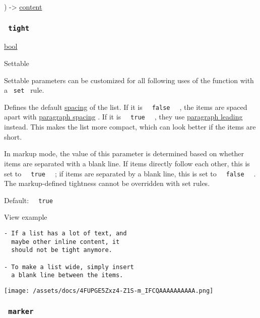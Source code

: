 ) -\textgreater{} \href{/docs/reference/foundations/content/}{content}

\subsubsection{\texorpdfstring{\texttt{\ tight\ }}{ tight }}\label{parameters-tight}

\href{/docs/reference/foundations/bool/}{bool}

{{ Settable }}

\label{parameters-tight-settable-tooltip}
Settable parameters can be customized for all following uses of the
function with a \texttt{\ set\ } rule.

Defines the default
\href{/docs/reference/model/list/\#parameters-spacing}{spacing} of the
list. If it is \texttt{\ }{\texttt{\ false\ }}\texttt{\ } , the items
are spaced apart with
\href{/docs/reference/model/par/\#parameters-spacing}{paragraph spacing}
. If it is \texttt{\ }{\texttt{\ true\ }}\texttt{\ } , they use
\href{/docs/reference/model/par/\#parameters-leading}{paragraph leading}
instead. This makes the list more compact, which can look better if the
items are short.

In markup mode, the value of this parameter is determined based on
whether items are separated with a blank line. If items directly follow
each other, this is set to \texttt{\ }{\texttt{\ true\ }}\texttt{\ } ;
if items are separated by a blank line, this is set to
\texttt{\ }{\texttt{\ false\ }}\texttt{\ } . The markup-defined
tightness cannot be overridden with set rules.

Default: \texttt{\ }{\texttt{\ true\ }}\texttt{\ }


View example

\begin{verbatim}
- If a list has a lot of text, and
  maybe other inline content, it
  should not be tight anymore.

- To make a list wide, simply insert
  a blank line between the items.
\end{verbatim}

\texttt{[image: /assets/docs/4FUPGE5Zxz4-Z1S-m\_IFCQAAAAAAAAAA.png]}

\subsubsection{\texorpdfstring{\texttt{\ marker\ }}{ marker }}\label{parameters-marker}

